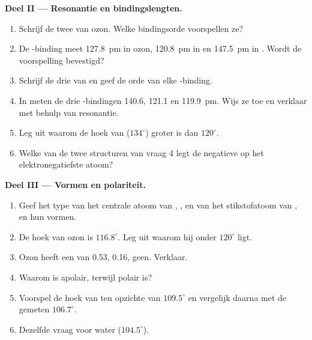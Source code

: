 \begin{problem}
\medskip
\noindent\textbf{Deel II --- Resonantie en bindingslengten.}
\begin{enumerate}[resume]
  \item Schrijf de twee  van ozon. Welke bindingsorde
        voorspellen ze?
  \item De -binding meet \qty{127.8}{pm} in ozon, \qty{120.8}{pm}
        in  en \qty{147.5}{pm} in . Wordt de voorspelling
        bevestigd?
  \item Schrijf de drie  van  en geef de orde
        van elke -binding.
  \item In  meten de drie -bindingen 140.6, 121.1 en
        \qty{119.9}{pm}. Wijs ze toe en verklaar met behulp van resonantie.
  \item Leg uit waarom de hoek  van  ($134^\circ$)
        groter is dan $120^\circ$.
  \item Welke van de twee structuren van vraag 4 legt de negatieve
         op het elektronegatiefste atoom?
\end{enumerate}

\medskip
\noindent\textbf{Deel III --- Vormen en polariteit.}
\begin{enumerate}[resume]
  \item Geef het type  van het centrale atoom van ,
        ,  en van het stikstofatoom van , en
        hun vormen.
  \item De hoek van ozon is $116.8^\circ$. Leg uit waarom hij onder
        $120^\circ$ ligt.
  \item Ozon heeft een  van \qty{0.53}{\debye}, 
        \qty{0.16}{\debye},  geen. Verklaar.
  \item Waarom is  apolair, terwijl  polair is?
  \item Voorspel de hoek van  ten opzichte van $109.5^\circ$ en
        vergelijk daarna met de gemeten $106.7^\circ$.
  \item Dezelfde vraag voor water ($104.5^\circ$).
\end{enumerate}


\end{problem}
